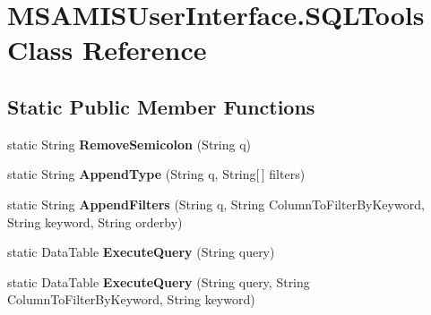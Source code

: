 \hypertarget{class_m_s_a_m_i_s_user_interface_1_1_s_q_l_tools}{}\section{M\+S\+A\+M\+I\+S\+User\+Interface.\+S\+Q\+L\+Tools Class Reference}
\label{class_m_s_a_m_i_s_user_interface_1_1_s_q_l_tools}
\subsection*{Static Public Member Functions}
\begin{DoxyCompactItemize}
\item 
\mbox{\label{class_m_s_a_m_i_s_user_interface_1_1_s_q_l_tools_a4b06be5087f863fca143875aada8cbb2}} 
static String {\bfseries Remove\+Semicolon} (String q)
\item 
\mbox{\label{class_m_s_a_m_i_s_user_interface_1_1_s_q_l_tools_af0f42efc67bfb8a1bb78e6a599270b30}} 
static String {\bfseries Append\+Type} (String q, String\mbox{[}$\,$\mbox{]} filters)
\item 
\mbox{\label{class_m_s_a_m_i_s_user_interface_1_1_s_q_l_tools_afcb039f11ba363bfc2a1a711f080eef8}} 
static String {\bfseries Append\+Filters} (String q, String Column\+To\+Filter\+By\+Keyword, String keyword, String orderby)
\item 
\mbox{\label{class_m_s_a_m_i_s_user_interface_1_1_s_q_l_tools_a8b5ad426a0baea504e1e89234113a0c4}} 
static Data\+Table {\bfseries Execute\+Query} (String query)
\item 
\mbox{\label{class_m_s_a_m_i_s_user_interface_1_1_s_q_l_tools_a778387a784c3e4b0e579b35be2218e2c}} 
static Data\+Table {\bfseries Execute\+Query} (String query, String Column\+To\+Filter\+By\+Keyword, String keyword)
\item 
\mbox{\label{class_m_s_a_m_i_s_user_interface_1_1_s_q_l_tools_ab3b172a2304c51b0b27261195605ddd7}} 

\end{DoxyCompactItemize}
